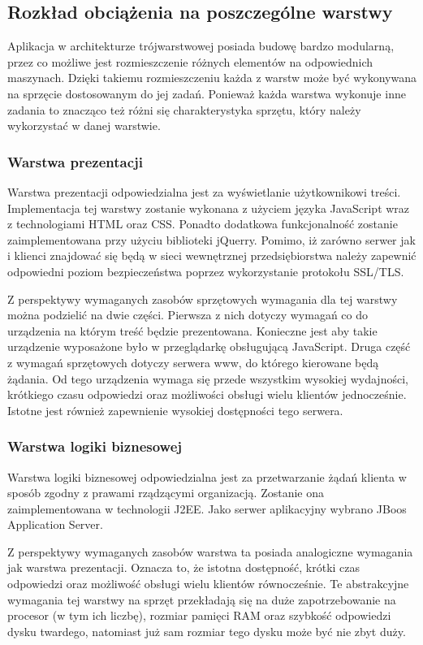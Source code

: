 \subsection{Rozkład obciążenia na poszczególne warstwy}

Aplikacja w architekturze trójwarstwowej posiada budowę bardzo
modularną, przez co możliwe jest rozmieszczenie różnych elementów na
odpowiednich maszynach. Dzięki takiemu rozmieszczeniu każda z warstw
może być wykonywana na sprzęcie dostosowanym do jej zadań. Ponieważ
każda warstwa wykonuje inne zadania to znacząco też różni się
charakterystyka sprzętu, który należy wykorzystać w danej warstwie.

\subsubsection{Warstwa prezentacji}

Warstwa prezentacji odpowiedzialna jest za wyświetlanie użytkownikowi
treści. Implementacja tej warstwy zostanie wykonana z użyciem języka
JavaScript wraz z technologiami HTML oraz CSS. Ponadto dodatkowa
funkcjonalność zostanie zaimplementowana przy użyciu biblioteki
jQuerry. Pomimo, iż zarówno serwer jak i klienci znajdować się będą w
sieci wewnętrznej przedsiębiorstwa należy zapewnić odpowiedni poziom
bezpieczeństwa poprzez wykorzystanie protokołu SSL/TLS.

Z perspektywy wymaganych zasobów sprzętowych wymagania dla tej warstwy
można podzielić na dwie części. Pierwsza z nich dotyczy wymagań co do
urządzenia na którym treść będzie prezentowana. Konieczne jest aby
takie urządzenie wyposażone było w przeglądarkę obsługującą
JavaScript. Druga część z wymagań sprzętowych dotyczy serwera www, do
którego kierowane będą żądania. Od tego urządzenia wymaga się przede
wszystkim wysokiej wydajności, krótkiego czasu odpowiedzi oraz
możliwości obsługi wielu klientów jednocześnie. Istotne jest również
zapewnienie wysokiej dostępności tego serwera.

\subsubsection{Warstwa logiki biznesowej}

Warstwa logiki biznesowej odpowiedzialna jest za przetwarzanie żądań
klienta w sposób zgodny z prawami rządzącymi organizacją. Zostanie ona
zaimplementowana w technologii J2EE. Jako serwer aplikacyjny wybrano
JBoos Application Server.

Z perspektywy wymaganych zasobów warstwa ta posiada analogiczne
wymagania jak warstwa prezentacji. Oznacza to, że istotna dostępność,
krótki czas odpowiedzi oraz możliwość obsługi wielu klientów
równocześnie. Te abstrakcyjne wymagania tej warstwy na sprzęt
przekładają się na duże zapotrzebowanie na procesor (w tym ich
liczbę), rozmiar pamięci RAM oraz szybkość odpowiedzi dysku twardego,
natomiast już sam rozmiar tego dysku może być nie zbyt duży.

